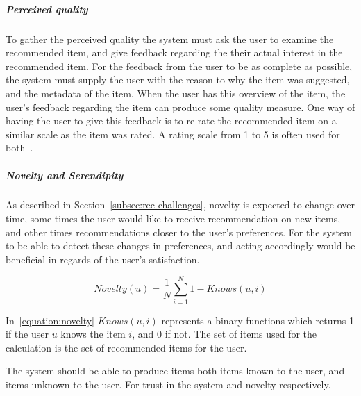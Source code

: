 \subparagraph{Perceived quality}
To gather the perceived quality the system must ask the user to examine the
recommended item, and give feedback regarding the their actual interest in the
recommended item.  For the feedback from the user to be as complete as
possible, the system must supply the user with the reason to why the item was
suggested, and the metadata of the item.  When the user has this overview of
the item, the user's feedback regarding the item can produce some quality
measure.  One  way of having the user to give this feedback is to re-rate the
recommended item on a similar scale as the item was rated.  A rating scale from
1 to 5 is often used for both~\cite{Schafer:1999:RSE:336992.337035}.

\subparagraph{Novelty and Serendipity}
As described in Section~\ref{subsec:rec-challenges},  novelty is expected to
change over time, some times the user would like to receive recommendation on
new items, and other times recommendations closer to the user's preferences.
For the system to be able to detect these changes in preferences, and acting
accordingly would be beneficial in regards of the user's satisfaction.

\begin{equation}
    Novelty(u) = \frac{1}{N}\sum_{i=1}^{N}{1 - Knows(u,i)}
    \label{equation:novelty}
\end{equation}

In~\ref{equation:novelty} $Knows(u,i)$ represents a binary functions which
returns 1 if the user $u$ knows the item $i$, and 0 if not.  The set of items
used for the calculation is the set of recommended items for the user.

The system should be able to produce items both items known to the user, and
items unknown to the user.  For trust in the system and novelty respectively.


